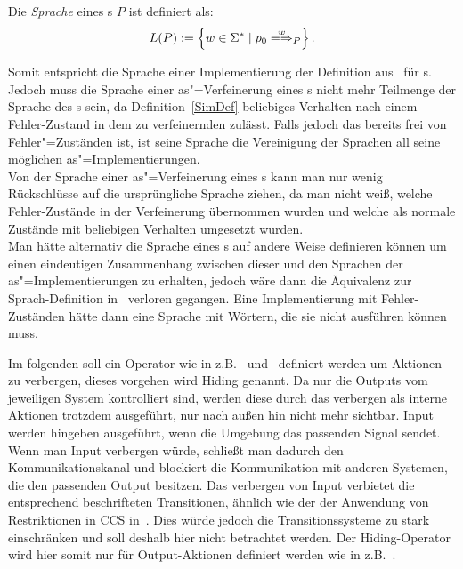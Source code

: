 \vspace{0.2cm}

\begin{Def}[Sprache]
  \label{LDef}
  Die \emph{Sprache} eines \MEIO{}s $P$ ist definiert als:
  \[L(P) := \left\{w\in \Sigma ^* \mid p_0\weakmay[w]_P \right\}.\]
\end{Def}

Somit entspricht die Sprache einer Implementierung der Definition
aus~\cite{Schinko2016BA} für \EIO{}s. Jedoch muss die Sprache einer
as"=Verfeinerung eines \MEIO{}s nicht mehr Teilmenge der Sprache des \MEIO{}s
sein, da Definition~\ref{SimDef} beliebiges Verhalten nach einem Fehler-Zustand
in dem zu verfeinernden \MEIO{} zulässt. Falls jedoch das \MEIO{} bereits frei
von Fehler"=Zuständen ist, ist seine Sprache die Vereinigung der Sprachen all
seine möglichen as"=Implementierungen.\\
Von der Sprache einer as"=Verfeinerung eines \MEIO{}s kann man nur wenig
Rückschlüsse auf die ursprüngliche Sprache ziehen, da man nicht weiß,
welche Fehler-Zustände in der Verfeinerung übernommen wurden und welche als
normale Zustände mit beliebigen Verhalten umgesetzt wurden.\\
Man hätte alternativ die Sprache eines \MEIO{}s auf andere Weise definieren
können um einen eindeutigen Zusammenhang zwischen dieser und den Sprachen der
as"=Implementierungen zu erhalten, jedoch wäre dann die Äquivalenz zur \EIO{}
Sprach-Definition in~\cite{Schinko2016BA} verloren gegangen. Eine
Implementierung mit Fehler-Zuständen hätte dann eine Sprache mit Wörtern, die
sie nicht ausführen können muss.

Im folgenden soll ein Operator wie in z.B.~\cite{Vogler2016MIA3}
und~\cite{Schinko2016BA} definiert werden um Aktionen zu verbergen, dieses
vorgehen wird Hiding genannt. Da nur die Outputs vom jeweiligen System
kontrolliert sind, werden diese durch das verbergen als interne Aktionen
trotzdem ausgeführt, nur nach außen hin nicht mehr sichtbar. Input werden
hingeben ausgeführt, wenn die Umgebung das passenden Signal sendet. Wenn man
Input verbergen würde, schließt man dadurch den Kommunikationskanal und
blockiert die Kommunikation mit anderen Systemen, die den passenden Output
besitzen. Das verbergen von Input verbietet die entsprechend beschrifteten
Transitionen, ähnlich wie der der Anwendung von Restriktionen in CCS
in~\cite{Milner1989}. Dies würde jedoch die Transitionssysteme zu stark
einschränken und soll deshalb hier nicht betrachtet werden. Der Hiding-Operator
wird hier somit nur für Output-Aktionen definiert werden wie in
z.B.~\cite{Schinko2016BA}.

